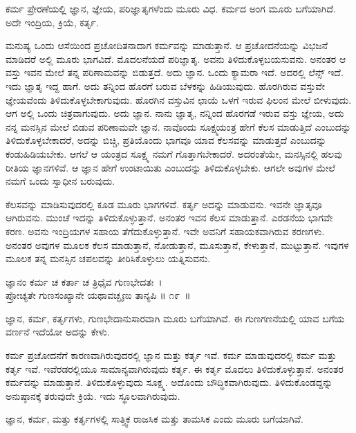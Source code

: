 \begin{artha}
ಕರ್ಮ ಪ್ರೇರಣೆಯಲ್ಲಿ ಜ್ಞಾನ, ಜ್ಞೇಯ, ಪರಿಜ್ಞಾತೃಗಳೆಂದು ಮೂರು ವಿಧ. ಕರ್ಮದ ಅಂಗ ಮೂರು ಬಗೆಯಾಗಿದೆ. ಅದೇ ಇಂದ್ರಿಯ, ಕ್ರಿಯೆ, ಕರ್ತೃ.
\end{artha}

ಮನುಷ್ಯ ಒಂದು ಆಸೆಯಿಂದ ಪ್ರಚೋದಿತನಾದಾಗ ಕರ್ಮವನ್ನು ಮಾಡುತ್ತಾನೆ. ಆ ಪ್ರಚೋದನೆಯನ್ನು ವಿಭಜನೆ ಮಾಡಿದರೆ ಅಲ್ಲಿ ಮೂರು ಭಾಗವಿದೆ. ಮೊದಲನೆಯದೆ ಪರಿಜ್ಞಾತೃ. ಅವನು ತಿಳಿದುಕೊಳ್ಳಬಯಸುವನು. ಅನಂತರ ಆ ವಸ್ತು ಇವನ ಮೇಲೆ ತನ್ನ ಪರಿಣಾಮವನ್ನು ಬಿಡುತ್ತದೆ. ಅದು ಜ್ಞಾನ. ಒಂದು ಕ್ಯಾಮರಾ ಇದೆ. ಅದರಲ್ಲಿ ಲೆನ್ಸ್ ಇದೆ. ಇದು ಜ್ಞಾತೃ ಇದ್ದ ಹಾಗೆ. ಅದು ತನ್ನಿಂದ ಹೊರಗೆ ಬರುವ ಬೆಳಕನ್ನು ಹಿಡಿಯುವುದು. ಹೊರಗಿರುವ ವಸ್ತುವೇ ಜ್ಞೇಯವೆಂದು ತಿಳಿದುಕೊಳ್ಳಬೇಕಾಗುವುದು. ಹೊರಗಿನ ವಸ್ತುವಿನ ಛಾಯೆ ಒಳಗೆ ಇರುವ ಫಿಲಂನ ಮೇಲೆ ಬೀಳುವುದು. ಆಗ ಅಲ್ಲಿ ಒಂದು ಚಿತ್ರವಾಗುವುದು. ಅದು ಜ್ಞಾನ. ನಾನು ಜ್ಞಾತೃ, ನನ್ನಿಂದ ಹೊರಗಡೆ ಇರುವ ವಸ್ತು ಜ್ಞೇಯ, ಅದು ನನ್ನ ಮನಸ್ಸಿನ ಮೇಲೆ ಬಿಡುವ ಪರಿಣಾಮವೇ ಜ್ಞಾನ. ನಾವೊಂದು ಸೂಕ್ಷ್ಮಯಂತ್ರ ಹೇಗೆ ಕೆಲಸ ಮಾಡುತ್ತಿದೆ ಎಂಬುದನ್ನು ತಿಳಿದುಕೊಳ್ಳಬೇಕಾದರೆ, ಅದನ್ನು ಬಿಚ್ಚಿ, ಪ್ರತಿಯೊಂದು ಭಾಗವೂ ಯಾವ ಕೆಲಸವನ್ನು ಮಾಡುತ್ತದೆ ಎಂಬುದನ್ನು ಕಂಡುಹಿಡಿಯಬೇಕು. ಆಗಲೆ ಆ ಯಂತ್ರದ ಸೂಕ್ಷ್ಮ ನಮಗೆ ಗೊತ್ತಾಗಬೇಕಾದರೆ. ಅದರಂತೆಯೇ, ಮನಸ್ಸಿನಲ್ಲಿ ಹಲವು ರೀತಿಯ ಜ್ಞಾನಗಳಿವೆ. ಆ ಜ್ಞಾನ ಹೇಗೆ ಉಂಟಾಯಿತು ಎಂಬುದನ್ನು ತಿಳಿದುಕೊಳ್ಳಬೇಕು. ಆಗಲೇ ಅವುಗಳ ಮೇಲೆ ನಮಗೆ ಒಂದು ಸ್ವಾಧೀನ ಬರುವುದು.

ಕೆಲಸವನ್ನು ಮಾಡಿಸುವುದರಲ್ಲಿ ಕೂಡ ಮೂರು ಭಾಗಗಳಿವೆ. ಕರ್ತೃ ಅದನ್ನು ಮಾಡುವನು. ಇವನೇ ಜ್ಞಾತೃವೂ ಆಗಿರುವನು. ಮುಂಚೆ ಇದನ್ನು ತಿಳಿದುಕೊಳ್ಳುತ್ತಾನೆ. ಅನಂತರ ಇವನ ಕೆಲಸ ಮಾಡುತ್ತಾನೆ. ಎರಡನೆಯ ಭಾಗವೇ ಕರಣ. ಅವನು ಇಂದ್ರಿಯಗಳ ಸಹಾಯ ತೆಗೆದುಕೊಳ್ಳುತ್ತಾನೆ. ಇವೇ ಅವನಿಗೆ ಸಹಾಯಕವಾಗಿರುವ ಕರಣಗಳು. ಅನಂತರ ಅವುಗಳ ಮೂಲಕ ಕೆಲಸ ಮಾಡುತ್ತಾನೆ, ನೋಡುತ್ತಾನೆ, ಮೂಸುತ್ತಾನೆ, ಕೇಳುತ್ತಾನೆ, ಮುಟ್ಟುತ್ತಾನೆ. ಇವುಗಳ ಮೂಲಕ ತನ್ನ ಮನಸ್ಸಿನ ಚಪಲವನ್ನು ತೀರಿಸಿಕೊಳ್ಳುಲು ಯತ್ನಿಸುವನು.

\begin{shloka}
ಜ್ಞಾನಂ ಕರ್ಮ ಚ ಕರ್ತಾ ಚ ತ್ರಿಧೈವ ಗುಣಭೇದತಃ~।\\ಪ್ರೋಚ್ಯತೇ ಗುಣಸಂಖ್ಯಾನೇ ಯಥಾವಚ್ಛೃಣು ತಾನ್ಯಪಿ \hfill॥ ೧೯~॥
\end{shloka}

\begin{artha}
ಜ್ಞಾನ, ಕರ್ಮ, ಕರ್ತೃಗಳು, ಗುಣಭೇದಾನುಸಾರವಾಗಿ ಮೂರು ಬಗೆಯಾಗಿವೆ. ಈ ಗುಣಗಣನೆಯಲ್ಲಿ ಯಾವ ಬಗೆಯ ವರ್ಣನೆ ಇದೆಯೋ ಅದನ್ನು ಕೇಳು.
\end{artha}

ಕರ್ಮ ಪ್ರಚೋದನೆಗೆ ಕಾರಣವಾಗಿರುವುದರಲ್ಲಿ ಜ್ಞಾನ ಮತ್ತು ಕರ್ತೃ ಇವೆ. ಕರ್ಮ ಮಾಡುವುದರಲ್ಲಿ ಕರ್ಮ ಮತ್ತು ಕರ್ತೃ ಇವೆ. ಇವೆರಡರಲ್ಲಿಯೂ ಸಾಮಾನ್ಯವಾಗಿರುವುದು ಕರ್ತೃ. ಈ ಕರ್ತೃ ಮೊದಲು ತಿಳಿದುಕೊಳ್ಳುತ್ತಾನೆ. ಅನಂತರ ಕರ್ಮವನ್ನು ಮಾಡುತ್ತಾನೆ. ತಿಳಿದುಕೊಳ್ಳುವುದು ಸೂಕ್ಷ್ಮ. ಅದೊಂದು ಬೌದ್ಧಿಕವಾಗಿರುವುದು. ತಿಳಿದುಕೊಂಡದ್ದನ್ನು ಅನುಷ್ಠಾನಕ್ಕೆ ತರುವುದೇ ಕ್ರಿಯೆ. ಇದು ಸ್ಥೂಲವಾಗಿರುವುದು.

ಜ್ಞಾನ, ಕರ್ಮ, ಮತ್ತು ಕರ್ತೃಗಳಲ್ಲಿ ಸಾತ್ತ್ವಿಕ ರಾಜಸಿಕ ಮತ್ತು ತಾಮಸಿಕ ಎಂದು ಮೂರು ಬಗೆಯಾಗಿವೆ.

